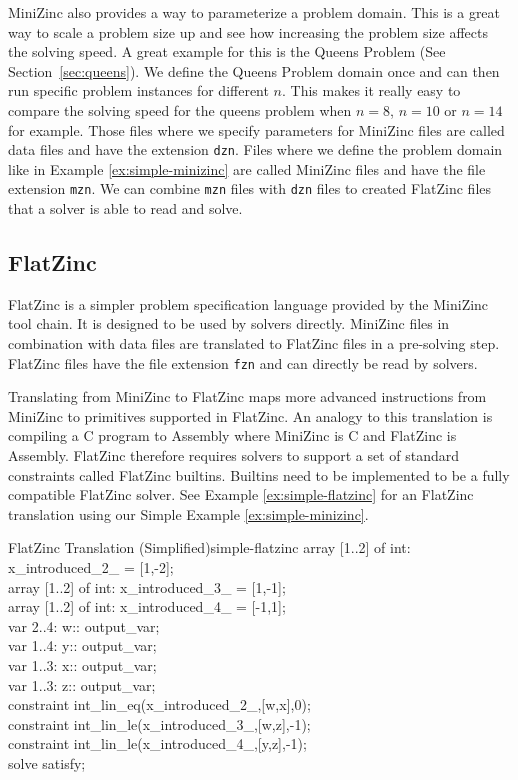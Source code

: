 MiniZinc also provides a way to parameterize a problem domain. This is a great way to scale a problem size up and see how increasing the problem size affects the solving speed. A great example for this is the Queens Problem (See Section~\ref{sec:queens}). We define the Queens Problem domain once and can then run specific problem instances for different $n$. This makes it really easy to compare the solving speed for the queens problem when $n = 8$, $n = 10$ or $n = 14$ for example. Those files where we specify parameters for MiniZinc files are called data files and have the extension \verb|dzn|. Files where we define the problem domain like in Example \ref{ex:simple-minizinc} are called MiniZinc files and have the file extension \verb|mzn|. We can combine \verb|mzn| files with \verb|dzn| files to created FlatZinc files that a solver is able to read and solve.

\subsection{FlatZinc}

FlatZinc is a simpler problem specification language provided by the MiniZinc tool chain. It is designed to be used by solvers directly. MiniZinc files in combination with data files are translated to FlatZinc files in a pre-solving step. FlatZinc files have the file extension \verb|fzn| and can directly be read by solvers.

Translating from MiniZinc to FlatZinc maps more advanced instructions from MiniZinc to primitives supported in FlatZinc. An analogy to this translation is compiling a C program to Assembly where MiniZinc is C and FlatZinc is Assembly. FlatZinc therefore requires solvers to support a set of standard constraints called FlatZinc builtins. Builtins need to be implemented to be a fully compatible FlatZinc solver. See Example \ref{ex:simple-flatzinc} for an FlatZinc translation using our Simple Example \ref{ex:simple-minizinc}.

\begin{example}{FlatZinc Translation (Simplified)}{simple-flatzinc}
	array [1..2] of int: x\_introduced\_2\_ = [1,-2]; \\
	array [1..2] of int: x\_introduced\_3\_ = [1,-1]; \\
	array [1..2] of int: x\_introduced\_4\_ = [-1,1]; \\
	var 2..4: w:: output\_var; \\
	var 1..4: y:: output\_var; \\
	var 1..3: x:: output\_var; \\
	var 1..3: z:: output\_var; \\
	constraint int\_lin\_eq(x\_introduced\_2\_,[w,x],0); \\
	constraint int\_lin\_le(x\_introduced\_3\_,[w,z],-1); \\
	constraint int\_lin\_le(x\_introduced\_4\_,[y,z],-1); \\
	solve  satisfy;
\end{example}


